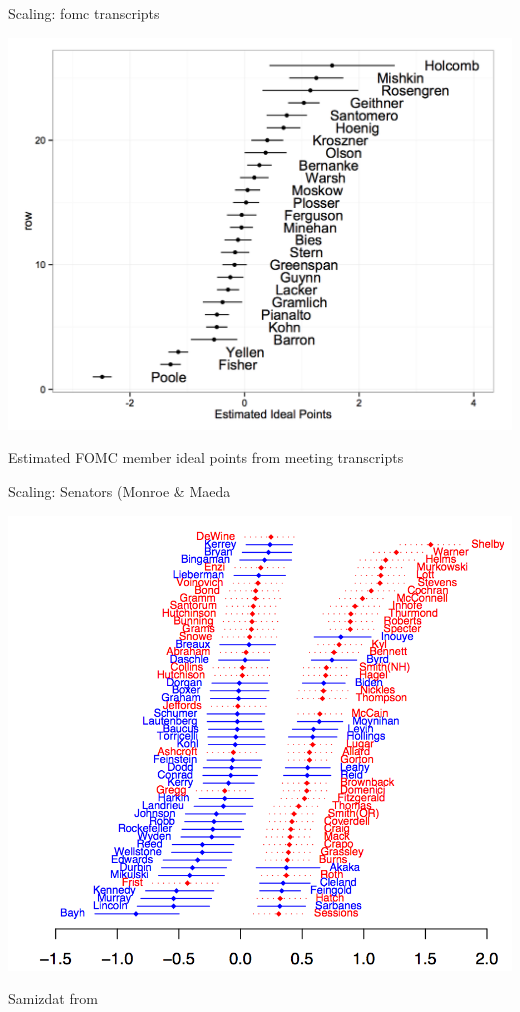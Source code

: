 \documentclass{hertieteaching}
\begin{document}
\begin{frame}{Scaling: fomc transcripts}

\centerline{\includegraphics[scale=0.35]{pictures/fomc-ip}}
Estimated FOMC member ideal points from meeting transcripts  \parencite{Baerg.Lowe2020}

\end{frame}

\begin{frame}{Scaling: Senators (Monroe \& Maeda}

\centerline{\includegraphics[scale=0.25]{pictures/senator-ip-monroe-maeda} }
Samizdat from \parencite{Monroe.Maeda2004}

\end{frame}
\end{document}
